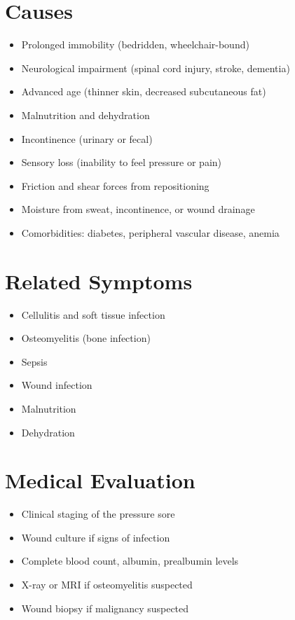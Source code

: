 \section*{Causes}
\begin{itemize}
\item Prolonged immobility (bedridden, wheelchair-bound)
\item Neurological impairment (spinal cord injury, stroke, dementia)
\item Advanced age (thinner skin, decreased subcutaneous fat)
\item Malnutrition and dehydration
\item Incontinence (urinary or fecal)
\item Sensory loss (inability to feel pressure or pain)
\item Friction and shear forces from repositioning
\item Moisture from sweat, incontinence, or wound drainage
\item Comorbidities: diabetes, peripheral vascular disease, anemia
\end{itemize}

\section*{Related Symptoms}
\begin{itemize}
\item Cellulitis and soft tissue infection
\item Osteomyelitis (bone infection)
\item Sepsis
\item Wound infection
\item Malnutrition
\item Dehydration
\end{itemize}

\section*{Medical Evaluation}
\begin{itemize}
\item Clinical staging of the pressure sore
\item Wound culture if signs of infection
\item Complete blood count, albumin, prealbumin levels
\item X-ray or MRI if osteomyelitis suspected
\item Wound biopsy if malignancy suspected
\end{itemize}

